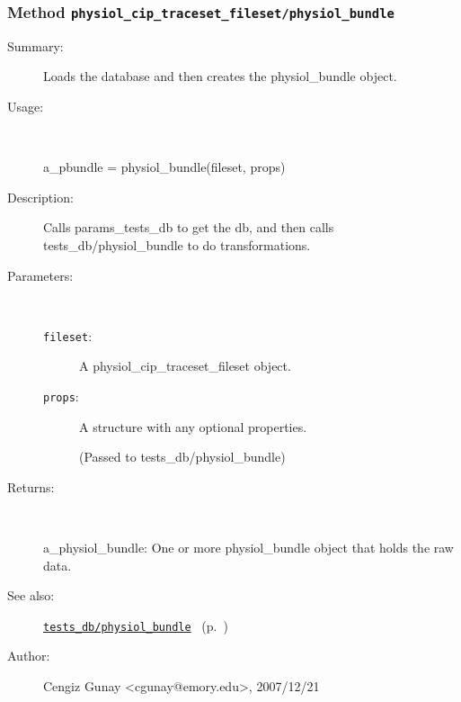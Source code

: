 \subsubsection[Method \texttt{physiol\_bundle}]{Method \texttt{physiol\_cip\_traceset\_fileset/physiol\_bundle}}%
%
\label{ref_physiol_cip_traceset_fileset__physiol_bundle}%
\hypertarget{ref_physiol_cip_traceset_fileset__physiol_bundle}{}%
\begin{description}
\item[Summary:]Loads the database and then creates the physiol\_bundle object.
%
\item[Usage:]~%
\begin{lyxcode}%
a\_pbundle = physiol\_bundle(fileset, props)
%
\end{lyxcode}%
%
\item[Description:]%
Calls params\_tests\_db to get the db, and then calls
 tests\_db/physiol\_bundle to do transformations.
\item[Parameters:]~
\begin{description}%
\item[\texttt{fileset}:]
 A physiol\_cip\_traceset\_fileset object.
\item[\texttt{props}:]
 A structure with any optional properties.

(Passed to tests\_db/physiol\_bundle)
\end{description}%
%
\item[Returns:
]~

	a\_physiol\_bundle: One or more physiol\_bundle object that holds the raw data.
%
%
\item[See also:]%
\hyperlink{ref_tests_db__physiol_bundle}{\texttt{tests\_db/physiol\_bundle}}%
\ (p.~\pageref{ref_tests_db__physiol_bundle})%
%
%
\item[Author:]%
Cengiz Gunay <cgunay@emory.edu>, 2007/12/21
%
\end{description}
\methodline%
